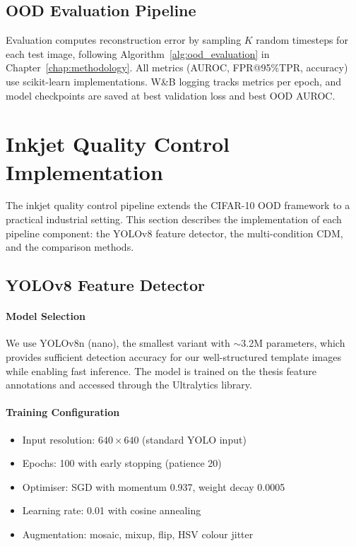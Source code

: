 \subsection{OOD Evaluation Pipeline}
\label{sec:impl:cifar10_eval}

Evaluation computes reconstruction error by sampling $K$ random timesteps for each test image, following Algorithm~\ref{alg:ood_evaluation} in Chapter~\ref{chap:methodology}. All metrics (AUROC, FPR@95\%TPR, accuracy) use scikit-learn implementations. W\&B logging tracks metrics per epoch, and model checkpoints are saved at best validation loss and best OOD AUROC.


\section{Inkjet Quality Control Implementation}
\label{sec:impl:inkjet_qc}

The inkjet quality control pipeline extends the CIFAR-10 OOD framework to a practical industrial setting. This section describes the implementation of each pipeline component: the YOLOv8 feature detector, the multi-condition CDM, and the comparison methods.

\subsection{YOLOv8 Feature Detector}
\label{sec:impl:yolov8}

\paragraph{Model Selection}

We use YOLOv8n (nano), the smallest variant with $\sim$3.2M parameters, which provides sufficient detection accuracy for our well-structured template images while enabling fast inference. The model is trained on the thesis feature annotations and accessed through the Ultralytics library.

\paragraph{Training Configuration}
\begin{itemize}
\item Input resolution: $640 \times 640$ (standard YOLO input)
\item Epochs: 100 with early stopping (patience 20)
\item Optimiser: SGD with momentum 0.937, weight decay 0.0005
\item Learning rate: 0.01 with cosine annealing
\item Augmentation: mosaic, mixup, flip, HSV colour jitter
\end{itemize}

